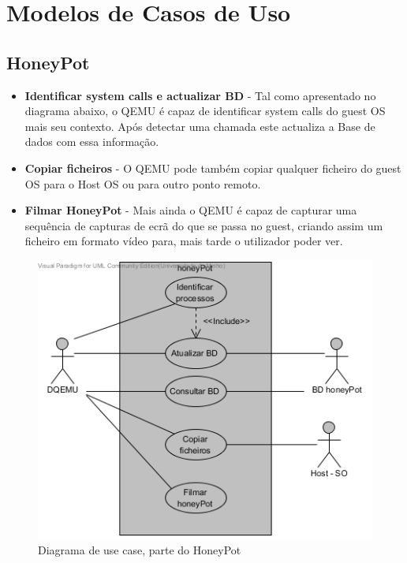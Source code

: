 \newpage
\section{Modelos de Casos de Uso}

\subsection{\textbf{HoneyPot}}
\begin{itemize}
 \item \textbf{Identificar system calls e actualizar BD} -  Tal como apresentado no diagrama abaixo, o QEMU é capaz de identificar system calls
 do guest OS mais seu contexto. Após detectar uma chamada este actualiza a Base de dados com essa informação. 
 \item \textbf{Copiar ficheiros} - O QEMU pode também copiar qualquer ficheiro do guest OS para o Host OS ou para outro ponto remoto.
 \item \textbf{Filmar HoneyPot} - Mais ainda o QEMU é capaz de capturar uma sequência de capturas de ecrã do que se passa no guest, 
 criando assim um ficheiro em formato vídeo para, mais tarde o utilizador poder ver.
 \end{itemize}

\begin{figure}[!ht]
	\centering
	\includegraphics[scale=0.80]{images/ucs/HoneyPot}
	\caption {Diagrama de use case, parte do HoneyPot}
\end{figure}
\pagebreak

